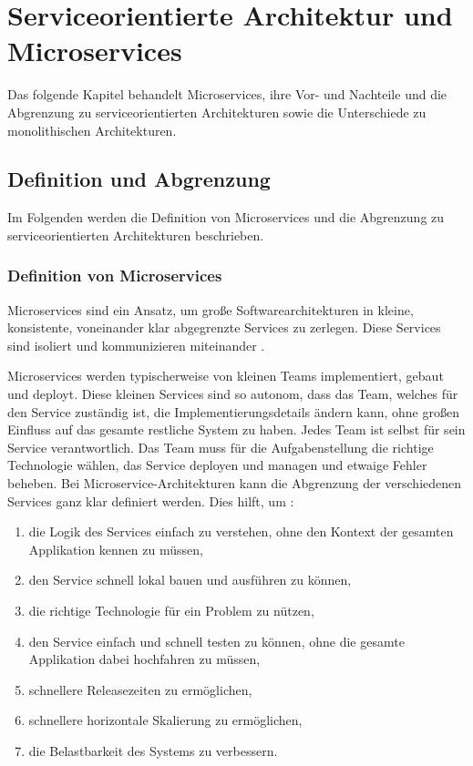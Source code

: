 \chapter{Serviceorientierte Architektur und Microservices}
Das folgende Kapitel behandelt Microservices, ihre Vor- und Nachteile und die Abgrenzung zu serviceorientierten Architekturen sowie die Unterschiede zu monolithischen Architekturen.
\section{Definition und Abgrenzung}
Im Folgenden werden die Definition von Microservices und die Abgrenzung zu serviceorientierten Architekturen beschrieben.

\subsection{Definition von Microservices}
Microservices sind ein Ansatz, um große Softwarearchitekturen in kleine, konsistente, voneinander klar abgegrenzte Services zu zerlegen. Diese Services sind isoliert und kommunizieren miteinander \cite{MicroservicesForJavaDevelopers}.

Microservices werden typischerweise von kleinen Teams implementiert, gebaut und deployt. Diese kleinen Services sind so autonom, dass das Team, welches für den Service zuständig ist, die Implementierungsdetails ändern kann, ohne großen Einfluss auf das gesamte restliche System zu haben.
Jedes Team ist selbst für sein Service verantwortlich. Das Team muss für die Aufgabenstellung die richtige Technologie wählen, das Service deployen und managen und etwaige Fehler beheben.
Bei Microservice-Architekturen kann die Abgrenzung der verschiedenen Services ganz klar definiert werden. \cite{MicroservicesForJavaDevelopers} Dies hilft, um \cite{MicroservicesForJavaDevelopers}:
\begin{enumerate}
	\item \label{SOA:Abgrenzung:logik} die Logik des Services einfach zu verstehen, ohne den Kontext der gesamten Applikation kennen zu müssen,
	\item \label{SOA:Abgrenzung:bauen} den Service schnell lokal bauen und ausführen zu können,
	\item \label{SOA:Abgrenzung:technologie} die richtige Technologie für ein Problem zu nützen,
	\item \label{SOA:Abgrenzung:testen} den Service einfach und schnell testen zu können, ohne die gesamte Applikation dabei hochfahren zu müssen,
	\item \label{SOA:Abgrenzung:release} schnellere Releasezeiten zu ermöglichen,
	\item \label{SOA:Abgrenzung:skalierung} schnellere horizontale Skalierung zu ermöglichen,
	\item \label{SOA:Abgrenzung:belastbarkeit} die Belastbarkeit des Systems zu verbessern.
\end{enumerate}

